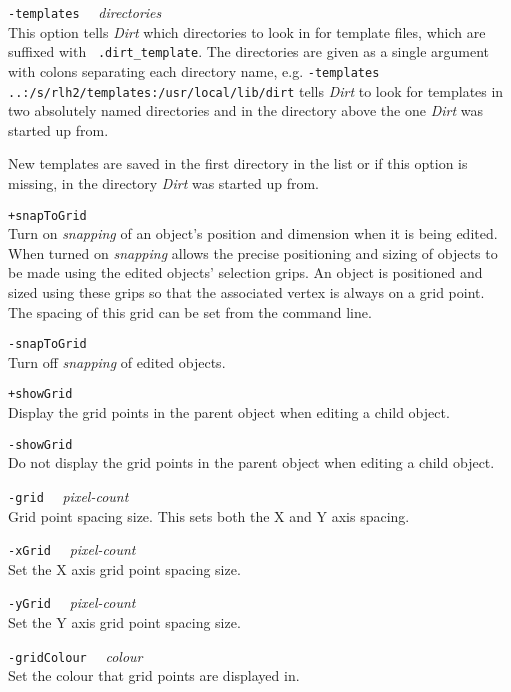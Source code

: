 \begin{description}
\item{{\tt -templates} ~~\em directories} \\
This option tells {\em Dirt} which directories to look in for template files,
which are suffixed with ~{\tt .dirt\_template}.
The directories are given as a single
argument with colons separating each directory name, {e.g.}
{\tt -templates ..:/s/rlh2/templates:/usr/local/lib/dirt}
tells {\em Dirt} to look for templates in two absolutely named directories
and in the directory above the one {\em Dirt} was started up from.

New templates are saved in the first directory in the list or if this option
is missing, in the directory {\em Dirt} was started up from.

\item{\tt +snapToGrid} \\
Turn on {\em snapping} of an object's position and dimension when it is being
edited.  When turned on {\em snapping} allows the precise positioning and
sizing of objects to be made using the edited objects' selection grips.
An object is positioned and sized using these grips so that the associated
vertex is always on a grid point.  The spacing of this grid can be set
from the command line.

\item{\tt -snapToGrid} \\
Turn off {\em snapping} of edited objects.

\item{\tt +showGrid} \\
Display the grid points in the parent object when editing a child object.

\item{\tt -showGrid} \\
Do not display the grid points in the parent object when editing a child object.

\item{{\tt -grid} ~~\em pixel-count} \\
Grid point spacing size.  This sets both the X and Y axis spacing.

\item{{\tt -xGrid} ~~\em pixel-count} \\
Set the X axis grid point spacing size.

\item{{\tt -yGrid} ~~\em pixel-count} \\
Set the Y axis grid point spacing size.

\item{{\tt -gridColour} ~~\em colour} \\
Set the colour that grid points are displayed in.


\end{description}
